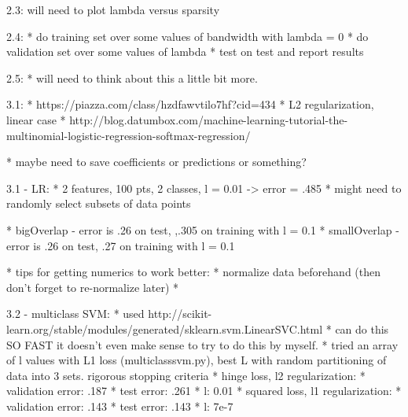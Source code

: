 \documentclass[10pt]{article}
\begin{document}
2.3:
will need to plot lambda versus sparsity

2.4:
* do training set over some values of bandwidth with lambda = 0
* do validation set over some values of lambda
* test on test and report results

2.5:
* will need to think about this a little bit more.

3.1:
* https://piazza.com/class/hzdfawvtilo7hf?cid=434
* L2 regularization, linear case
* http://blog.datumbox.com/machine-learning-tutorial-the-multinomial-logistic-regression-softmax-regression/

* maybe need to save coefficients or predictions or something?

3.1 - LR:
* 2 features, 100 pts, 2 classes, l = 0.01 -> error = .485
* might need to randomly select subsets of data points

* bigOverlap - error is .26 on test, ,.305 on training with l = 0.1
* smallOverlap - error is .26 on test, .27 on training with l = 0.1

* tips for getting numerics to work better:
	* normalize data beforehand (then don't forget to re-normalize later)
	* 

3.2 - multiclass SVM:
* used http://scikit-learn.org/stable/modules/generated/sklearn.svm.LinearSVC.html
* can do this SO FAST it doesn't even make sense to try to do this by myself.
* tried an array of l values with L1 loss (multiclasssvm.py), best L with random partitioning of data into 3 sets. rigorous stopping criteria
* hinge loss, l2 regularization: 
	* validation error: .187
	* test error: .261
	* l: 0.01
* squared loss, l1 regularization:
	* validation error: .143
	* test error: .143
	* l: 7e-7
\end{document}
